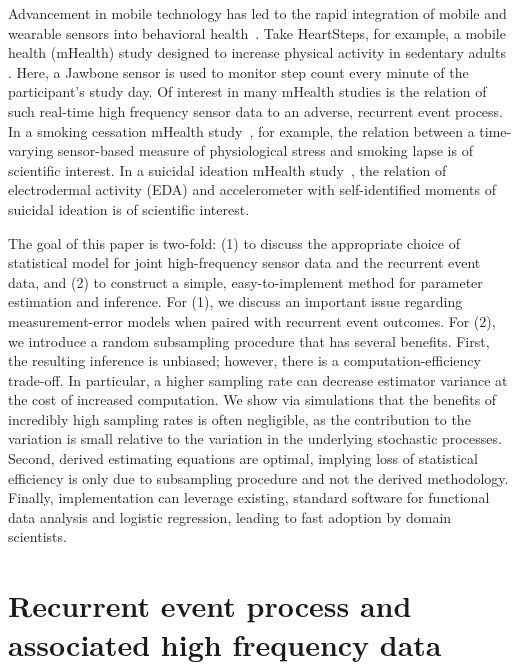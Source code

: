 \documentclass[11pt]{amsart}
\begin{document}
Advancement in mobile technology has led to the rapid integration of mobile and wearable sensors into behavioral health~\citep{Freeetal2013}. Take HeartSteps, for example, a mobile health (mHealth) study designed to increase physical activity in sedentary adults \citep{KlasnjaHS2019}. Here, a Jawbone sensor is used to monitor step count every minute of the participant's study day. Of interest in many mHealth studies is the relation of such real-time high frequency sensor data to an adverse, recurrent event process. In a smoking cessation mHealth study~\citep{Sense2Stop}, for example, the relation between a time-varying sensor-based measure of physiological stress and smoking lapse is of scientific interest. In a suicidal ideation mHealth study~\citep{Kleiman2018}, the relation of electrodermal activity (EDA) and accelerometer with self-identified moments of suicidal ideation is of scientific interest.

The goal of this paper is two-fold: (1) to discuss the appropriate choice of statistical model for joint high-frequency sensor data and the recurrent event data, and (2) to construct a simple, easy-to-implement method for parameter estimation and inference. For (1), we discuss an important issue regarding measurement-error models when paired with recurrent event outcomes. For (2), we introduce a random subsampling procedure that has several benefits.  First, the resulting inference is unbiased; however, there is a computation-efficiency trade-off. In particular, a higher sampling rate can decrease estimator variance at the cost of increased computation.  We show via simulations that the benefits of incredibly high sampling rates is often negligible, as the contribution to the variation is small relative to the variation in the underlying stochastic processes. Second, derived estimating equations are optimal, implying loss of statistical efficiency is only due to subsampling procedure and not the derived methodology.  Finally, implementation can leverage existing, standard software for functional data analysis and logistic regression, leading to fast adoption by domain scientists.

\section{Recurrent event process and associated high frequency data}
\end{document}
